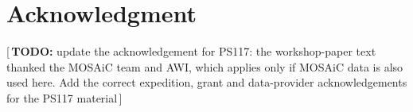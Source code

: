 \documentclass[conference]{IEEEtran}
\newif\ifdraftnotes\draftnotestrue
\newcommand{\needswork}[1]{%
  \ifdraftnotes\textcolor{red!75!black}{\small[\,\textbf{TODO:} #1\,]}\fi}
\begin{document}
\section*{Acknowledgment}
\needswork{update the acknowledgement for PS117: the workshop-paper text
thanked the MOSAiC team and AWI, which applies only if MOSAiC data is also
used here. Add the correct expedition, grant and data-provider acknowledgements
for the PS117 material}



\end{document}
